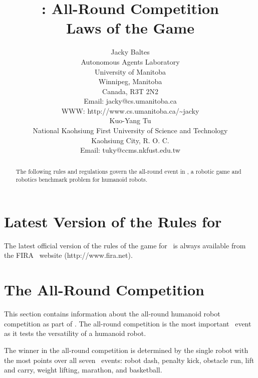 \documentclass[12pt]{hurocup}
\begin{document}


\title{\HuroCup: All-Round Competition\\
  Laws of the Game \thisyear}


\author{Jacky Baltes\\
Autonomous Agents Laboratory\\
University of Manitoba\\
Winnipeg, Manitoba\\
Canada, R3T 2N2\\
Email: jacky@cs.umanitoba.ca\\
WWW: http://www.cs.umanitoba.ca/\~{ }jacky\\[5mm]
Kuo-Yang Tu\\
National Kaohsiung First University of Science and Technology\\
Kaohsiung City, R. O. C.\\
Email: tuky@ccms.nkfust.edu.tw\\
}

\maketitle
\begin{abstract}
The following rules and regulations govern the all-round event in
\HuroCup, a robotic game and robotics benchmark problem for humanoid
robots.
%
\end{abstract}

\section*{Latest Version of the Rules for \HuroCup}
\label{sec:updates}

The latest official version of the rules of the game for \HuroCup\ is
always available from the FIRA \HuroCup\ website (http://www.fira.net).

\newpage

\section{The All-Round Competition}
\label{sec:all-round} 

This section contains information about the all-round humanoid robot
competition as part of \HuroCup. The all-round competition is the most
important \HuroCup\ event as it tests the versatility of a humanoid
robot. 

The winner in the all-round competition is determined by the single
robot with the most points over all seven \HuroCup\ events: robot dash,
penalty kick, obstacle run, lift and carry, weight lifting, marathon,
and basketball.
\end{document}
